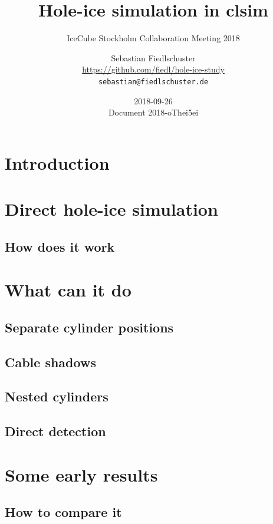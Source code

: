 \documentclass[green, 12pt]{beamer}
\title{Hole-ice simulation in clsim}
\subtitle{IceCube Stockholm Collaboration Meeting 2018}
\date{2018-09-26 \\ \vspace*{2mm} \tiny{Document 2018-oThei5ei}}
\author[Sebastian Fiedlschuster \texttt{<sebastian@fiedlschuster.de>}]{Sebastian Fiedlschuster \\ \tiny{\url{https://github.com/fiedl/hole-ice-study}} \\ \tiny\texttt{sebastian@fiedlschuster.de}}
\institute{Erlangen Centre for Astroparticle Physics}
\newif\ifplacelogo %
\begin{document}



\placelogofalse

\section{Introduction}
  
  


  \section{Direct hole-ice simulation}
  \subsection{How does it work}
    

  \section{What can it do}
  \subsection{Separate cylinder positions}
    
  \subsection{Cable shadows}
    
  \subsection{Nested cylinders}
    
    
  \subsection{Direct detection}
    

  \section{Some early results}
  \subsection{How to compare it}
    
\end{document}
